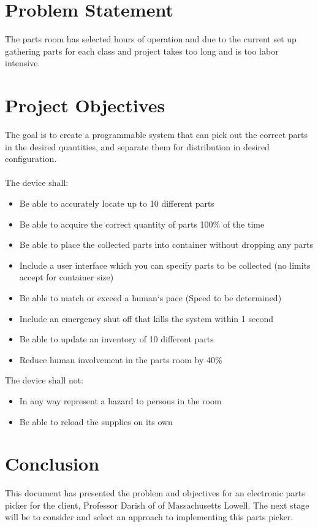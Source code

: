 \documentclass[12pt]{report}
\begin{document}
\section*{Problem Statement}

The parts room has selected hours of operation and due to the current set up gathering parts for each class and project takes too long and is too labor intensive.

\section*{Project Objectives}

The goal is to create a programmable system that can pick out the correct parts in the desired quantities, and separate them for distribution in desired configuration.  \\ \\

\noindent The device shall: \\
\begin{itemize}
\item Be able to accurately locate up to 10 different parts
\item Be able to acquire the correct quantity of parts 100\% of the time
\item Be able to place the collected parts into container without dropping any parts
\item Include a user interface which you can specify parts to be collected (no limits accept for container size)
\item Be able to match or exceed a human`s pace (Speed to be determined)
\item Include an emergency shut off that kills the system within 1 second
\item Be able to update an inventory of 10 different parts
\item Reduce human involvement in the parts room by 40\%
\end{itemize}


\noindent The device shall not: \\
\begin{itemize}
\item In any way represent a hazard to persons in the room
\item Be able to reload the supplies on its own
\end{itemize}

\section*{Conclusion}

This document has presented the problem and objectives for an electronic parts picker for the client, Professor Darish of 
 of Massachusetts Lowell.  The next stage will be to consider and select an approach to implementing this parts picker.  
\end{document}

